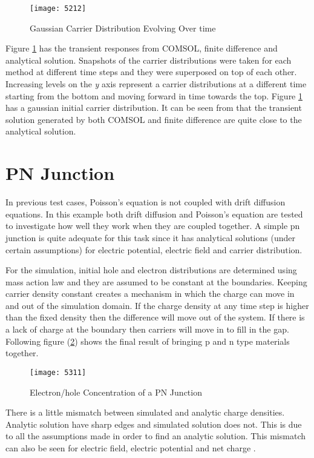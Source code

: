\begin{doublespace}
\begin{figure}[ht]
\centering
\texttt{[image: 5212]}
\caption{Gaussian Carrier Distribution Evolving Over time} 
\label{51}
\end{figure}

Figure \ref{51} has the transient responses from COMSOL, finite difference and analytical solution. Snapshots of the carrier distributions were taken for each method at different time steps and they were superposed on top of each other. Increasing levels on the \textit{y} axis represent a carrier distributions at a different time starting from the bottom and moving forward in time towards the top. Figure \ref{51} has a gaussian initial carrier distribution. It can be seen from that the transient solution generated by both COMSOL and finite difference are quite close to the analytical solution.


\clearpage
\section{PN Junction}
In previous test cases, Poisson's equation is not coupled with drift diffusion equations. In this example both drift diffusion and Poisson's equation are tested to investigate how well they work when they are coupled together. A simple pn junction is quite adequate for this task since it has analytical solutions (under certain assumptions) for electric potential, electric field and carrier distribution.

For the simulation, initial hole and electron distributions are determined using mass action law and they are assumed to be constant at the boundaries. Keeping carrier density constant creates a mechanism in which the charge can move in and out of the simulation domain. If the charge density at any time step is higher than the fixed density then the difference will move out of the system. If there is a lack of charge at the boundary then carriers will move in to fill in the gap. Following figure (\ref{npcon}) shows the final result of bringing p and n type materials together. 
 
\begin{figure}[ht]
\centering
\texttt{[image: 5311]}
\caption{Electron/hole Concentration of a PN Junction} 
\label{npcon}
\end{figure}

There is a little mismatch between simulated and analytic charge densities. Analytic solution have sharp edges and simulated solution does not. This is due to all the assumptions made in order to find an analytic solution. This mismatch can also be seen for electric field, electric potential and net charge .


\end{doublespace}
